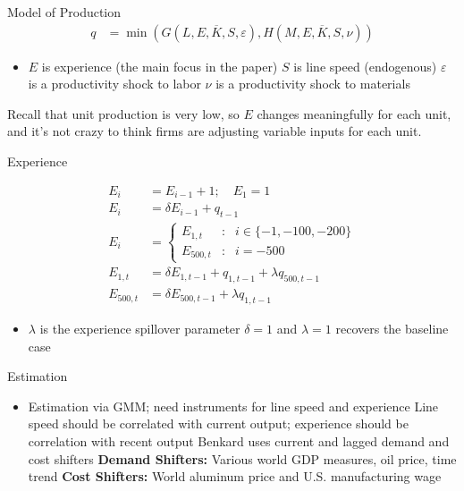 \documentclass[dvipsnames]{beamer}
\begin{document}
%
\begin{frame}{Model of Production}
  \vspace{-2em}
  \begin{align*}
    q &= \min (G(L, E, \overline{K}, S, \varepsilon),
        H(M, E, \overline{K}, S, \nu )) \tag{Leontief} 
  \end{align*}
  \vspace{-1em}
  \begin{itemize}
  \item $E$ is experience (the main focus in the paper)
    \vitem $S$ is line speed (endogenous)
    \vitem $\varepsilon$ is a productivity shock to labor
    \vitem $\nu$ is a productivity shock to materials
  \end{itemize}
  \vfill
  Recall that unit production is very low, so $E$ changes meaningfully for each unit, and it's not crazy to think firms are adjusting variable inputs for each unit.
\end{frame}
%
\begin{frame}{Experience}
\begin{fleqn}[0pt]
  \begin{align*}
    E_i &= E_{i - 1} + 1; \quad E_{1} = 1 \tag{baseline}\\[2em]
    E_i &= \delta E_{i - 1} + q_{t - 1} \tag{with forgetting}\\[2em]
    E_i &= \left\{
          \begin{array}{lcl}
            E_{1, t}& : & i \in \{-1, -100, -200\}\\
            E_{500, t} & : & i = -500
          \end{array}\right. \tag{inc. spillovers}\\[1em]
    E_{1, t} &= \delta E_{1, t - 1} + q_{1, t - 1} + \lambda q_{500, t - 1}\\
    E_{500, t} &= \delta E_{500, t - 1} + \lambda q_{1, t - 1}
  \end{align*}
  \end{fleqn}
  \begin{itemize}
  \item $\lambda$ is the experience spillover parameter
    \vitem $\delta = 1$ and $\lambda =1$ recovers the baseline case
  \end{itemize}
\end{frame}
%
\begin{frame}{Estimation}
  \begin{itemize}
  \item Estimation via GMM; need instruments for line speed and experience
   \vitem Line speed should be correlated with current output; experience should be correlation with recent output 
   \vitem Benkard uses current and lagged demand and cost shifters
   \vitem \textbf{Demand Shifters:} Various world GDP measures, oil price, time trend
   \vitem \textbf{Cost Shifters:} World aluminum price and U.S. manufacturing wage
  \end{itemize}
\end{frame}
\end{document}
